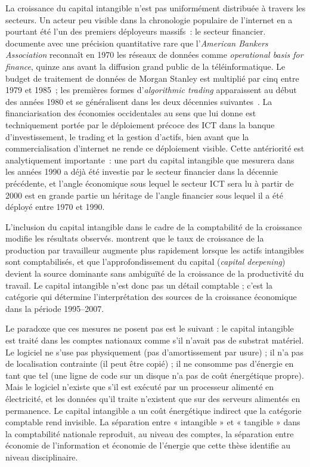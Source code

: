 %
La croissance du capital intangible n'est pas uniformément distribuée à travers les secteurs. Un acteur peu visible dans la chronologie populaire de l'internet en a pourtant été l'un des premiers déployeurs massifs~: le secteur financier. \textcite{schiller_digital_2014} documente avec une précision quantitative rare que l'\emph{American Bankers Association} reconnaît en 1970 les réseaux de données comme \emph{operational basis for finance}, quinze ans avant la diffusion grand public de la téléinformatique. Le budget de traitement de données de Morgan Stanley est multiplié par cinq entre 1979 et 1985~; les premières formes d'\emph{algorithmic trading} apparaissent au début des années 1980 et se généralisent dans les deux décennies suivantes~\parencite{mackenzie_trading_2021}. La financiarisation des économies occidentales au sens que lui donne \textcite{epstein_financialization_2005} est techniquement portée par le déploiement précoce des ICT dans la banque d'investissement, le trading et la gestion d'actifs, bien avant que la commercialisation d'internet ne rende ce déploiement visible. Cette antériorité est analytiquement importante~: une part du capital intangible que mesurera \textcite{corrado_intangible_2009} dans les années 1990 a déjà été investie par le secteur financier dans la décennie précédente, et l'angle économique sous lequel le secteur ICT sera lu à partir de 2000 est en grande partie un héritage de l'angle financier sous lequel il a été déployé entre 1970 et 1990.

L'inclusion du capital intangible dans le cadre de la comptabilité de la croissance modifie les résultats observés. \textcite{corrado_intangible_2009} montrent que le taux de croissance de la production par travailleur augmente plus rapidement lorsque les actifs intangibles sont comptabilisés, et que l'approfondissement du capital (\emph{capital deepening}) devient la source dominante sans ambiguïté de la croissance de la productivité du travail. Le capital intangible n'est donc pas un détail comptable ; c'est la catégorie qui détermine l'interprétation des sources de la croissance économique dans la période 1995--2007.
 
Le paradoxe que ces mesures ne posent pas est le suivant : le capital intangible est traité dans les comptes nationaux comme s'il n'avait pas de substrat matériel. Le logiciel ne s'use pas physiquement (pas d'amortissement par usure) ; il n'a pas de localisation contrainte (il peut être copié) ; il ne consomme pas d'énergie en tant que tel (une ligne de code sur un disque n'a pas de coût énergétique propre). Mais le logiciel n'existe que s'il est exécuté par un processeur alimenté en électricité, et les données qu'il traite n'existent que sur des serveurs alimentés en permanence. Le capital intangible a un coût énergétique indirect que la catégorie comptable rend invisible. La séparation entre « intangible » et « tangible » dans la comptabilité nationale reproduit, au niveau des comptes, la séparation entre économie de l'information et économie de l'énergie que cette thèse identifie au niveau disciplinaire.


